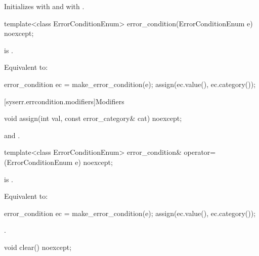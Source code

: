 \begin{itemdescr}
\pnum
\effects
Initializes  with 
and  with .
\end{itemdescr}

%
\begin{itemdecl}
template<class ErrorConditionEnum>
  error_condition(ErrorConditionEnum e) noexcept;
\end{itemdecl}

\begin{itemdescr}
\pnum
\constraints
{} is .

\pnum
\effects
Equivalent to:
\begin{codeblock}
error_condition ec = make_error_condition(e);
assign(ec.value(), ec.category());
\end{codeblock}
\end{itemdescr}


[syserr.errcondition.modifiers]{Modifiers}

%
\begin{itemdecl}
void assign(int val, const error_category& cat) noexcept;
\end{itemdecl}

\begin{itemdescr}
\pnum
\ensures
{} and .
\end{itemdescr}

%
\begin{itemdecl}
template<class ErrorConditionEnum>
  error_condition& operator=(ErrorConditionEnum e) noexcept;
\end{itemdecl}

\begin{itemdescr}
\pnum
\constraints
{} is .

\pnum
\effects
Equivalent to:
\begin{codeblock}
error_condition ec = make_error_condition(e);
assign(ec.value(), ec.category());
\end{codeblock}

\pnum
\returns
{}.
\end{itemdescr}

%
\begin{itemdecl}
void clear() noexcept;
\end{itemdecl}

